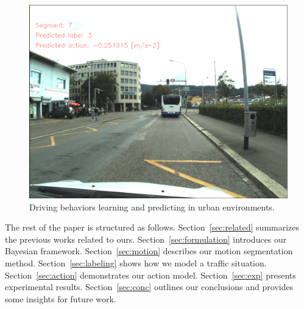 \begin{figure}[t]
\centering
\includegraphics[scale=0.132]{fig/finalResult.eps}
\caption{Driving behaviors learning and predicting in urban environments.}
\label{fig:final}
\end{figure}

The rest of the paper is structured as follows. Section~\ref{sec:related}
summarizes the previous works related to ours. Section~\ref{sec:formulation}
introduces our Bayesian framework. Section~\ref{sec:motion} describes our motion
segmentation method. Section~\ref{sec:labeling} shows how we model a traffic
situation. Section~\ref{sec:action} demonstrates our action model.
Section~\ref{sec:exp} presents experimental results. Section~\ref{sec:conc}
outlines our conclusions and provides some insights for future work.

